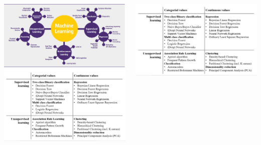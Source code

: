 \documentclass{beamer}
\begin{document}
\begin{frame}[plain]%
	\begin{columns}
		\begin{column}{0.7\textwidth}
			\includegraphics[scale=0.2]{mlinit}\\
			\includegraphics[scale=0.2]{mlmethods}
		\end{column}
		\begin{column}{0.3\textwidth}
			\includegraphics[scale=0.2]{mlmethods}
		\end{column}
	\end{columns}
\end{frame}
\end{document}
